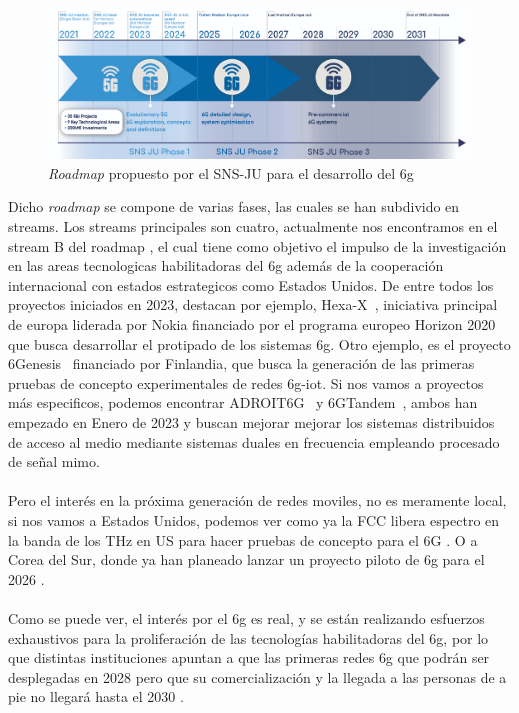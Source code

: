 \begin{figure}[ht]
    \centering
    \includegraphics[width=\textwidth]{archivos/img/intro/banner-screen-1.png}
    \caption{\textit{Roadmap} propuesto por el SNS-JU para el desarrollo del \gls{6g} \cite{eu6gSNS}}
    \label{fig:intro_banner_screen}
\end{figure}


Dicho \textit{roadmap} se compone de varias fases, las cuales se han subdivido en streams. Los streams principales son cuatro, actualmente nos encontramos en el stream B del roadmap \cite{eu6GFase2}, el cual tiene como objetivo el impulso de la investigación en las areas tecnologicas habilitadoras del \gls{6g} además de la cooperación internacional con estados estrategicos como Estados Unidos. De entre todos los proyectos iniciados en 2023, destacan por ejemplo, Hexa-X~\cite{9482430}, iniciativa principal de europa liderada por Nokia financiado por el programa europeo Horizon 2020 que busca desarrollar el protipado de los sistemas \gls{6g}. Otro ejemplo, es el proyecto 6Genesis~\cite{Katz2019} financiado por Finlandia, que busca la generación de las primeras pruebas de concepto experimentales de redes \gls{6g}-\gls{iot}. Si nos vamos a proyectos más especificos, podemos encontrar ADROIT6G~\cite{ADROIT6G} y 6GTandem~\cite{6GTandem}, ambos han empezado en Enero de 2023 y buscan mejorar mejorar los sistemas distribuidos de acceso al medio mediante sistemas duales en frecuencia empleando procesado de señal \gls{mimo}.\\
\\
Pero el interés en la próxima generación de redes moviles, no es meramente local, si nos vamos a Estados Unidos, podemos ver como ya la FCC libera espectro en la banda de los THz en US para hacer pruebas de concepto para el 6G \cite{us6g}. O a Corea del Sur, donde ya han planeado lanzar un proyecto piloto de \gls{6g} para el 2026 \cite{coreaSur6G}.\\
\\
Como se puede ver, el interés por el \gls{6g} es real, y se están realizando esfuerzos exhaustivos para la proliferación de las tecnologías habilitadoras del \gls{6g}, por lo que distintas instituciones apuntan a que las primeras redes \gls{6g} que podrán ser desplegadas en 2028 pero que su comercialización y la llegada a las personas de a pie no llegará hasta el 2030 \cite{Nguyen2022}.

